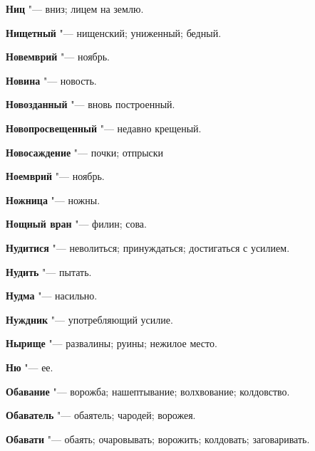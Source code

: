 \begin{mymulticols}{2}
\noindent\textbf{Ниц} "--- вниз; лицем на землю. 




\noindent\textbf{Нищетный} "--- нищенский; униженный; бедный. 




\noindent\textbf{Новемврий} "--- ноябрь. 




\noindent\textbf{Новина} "--- новость. 




\noindent\textbf{Новозданный} "--- вновь построенный. 




\noindent\textbf{Новопросвещенный} "--- недавно крещеный. 




\noindent\textbf{Новосаждение} "--- почки; отпрыски 




\noindent\textbf{Ноемврий} "--- ноябрь. 




\noindent\textbf{Ножница} "--- ножны. 




\noindent\textbf{Нощный вран} "--- филин; сова. 




\noindent\textbf{Нудитися} "--- неволиться; принуждаться; достигаться с усилием. 




\noindent\textbf{Нудить} "--- пытать. 




\noindent\textbf{Нудма} "--- насильно. 




\noindent\textbf{Нуждник} "--- употребляющий усилие. 




\noindent\textbf{Нырище} "--- развалины; руины; нежилое место. 




\noindent\textbf{Ню} "--- ее. 









\noindent\textbf{Обавание} "--- ворожба; нашептывание; волхвование; колдовство. 




\noindent\textbf{Обаватель} "--- обаятель; чародей; ворожея. 




\noindent\textbf{Обавати} "--- обаять; очаровывать; ворожить; колдовать; заговаривать. 





\end{mymulticols}
